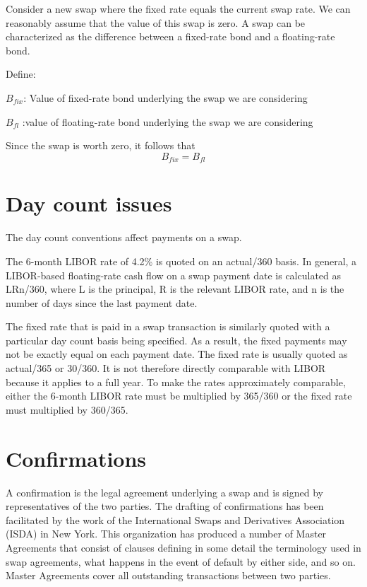 \documentclass{article}
\begin{document}
Consider a new swap where the fixed rate equals the current swap rate. We can reasonably assume that the value of this swap is zero. A swap can be characterized as the difference between a fixed-rate bond and a floating-rate bond.

Define:

$ B_{fix} $: Value of fixed-rate bond underlying the swap we are considering

$ B_{fl} $ :value of floating-rate bond underlying the swap we are considering

Since the swap is worth zero, it follows that
\begin{equation}
	B_{fix}=B_{fl}
\end{equation}

\section{Day count issues}
The day count conventions affect payments on a swap.

The 6-month LIBOR rate of 4.2\% is quoted on an actual/360 basis. In general, a LIBOR-based floating-rate cash flow on a swap payment date is calculated as LRn/360, where L is the principal, R is the relevant LIBOR rate, and n is the number of days since the last payment date.

The fixed rate that is paid in a swap transaction is similarly quoted with a particular day count basis being specified. As a result, the fixed payments may not be exactly equal on each payment date. The fixed rate is usually quoted as actual/365 or 30/360. It is not therefore directly comparable with LIBOR because it applies to a full year. To make the rates approximately comparable, either the 6-month LIBOR rate must be multiplied by 365/360 or the fixed rate must multiplied by 360/365.

\section{Confirmations}
A confirmation is the legal agreement underlying a swap and is signed by representatives of the two parties. The drafting of confirmations has been facilitated by the work of the International Swaps and Derivatives Association (ISDA) in New York. This organization has produced a number of Master Agreements that consist of clauses defining in some detail the terminology used in swap agreements, what happens in the event of default by either side, and so on. Master Agreements cover all outstanding transactions between two parties.
\end{document}

